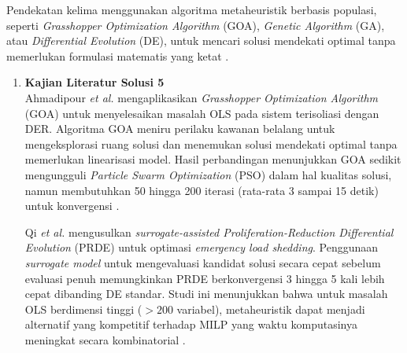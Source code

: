 Pendekatan kelima menggunakan algoritma metaheuristik berbasis populasi, seperti \textit{Grasshopper Optimization Algorithm} (GOA), \textit{Genetic Algorithm} (GA), atau \textit{Differential Evolution} (DE), untuk mencari solusi mendekati optimal tanpa memerlukan formulasi matematis yang ketat \cite{Ahmadipour2023, Qi2025}.

\begin{enumerate}
\item[a.] \textbf{Kajian Literatur Solusi 5} \\
Ahmadipour \textit{et al.} \cite{Ahmadipour2023} mengaplikasikan \textit{Grasshopper Optimization Algorithm} (GOA) untuk menyelesaikan masalah OLS pada sistem terisoliasi dengan DER. Algoritma GOA meniru perilaku kawanan belalang untuk mengeksplorasi ruang solusi dan menemukan solusi mendekati optimal tanpa memerlukan linearisasi model. Hasil perbandingan menunjukkan GOA sedikit mengungguli \textit{Particle Swarm Optimization} (PSO) dalam hal kualitas solusi, namun membutuhkan 50 hingga 200 iterasi (rata-rata 3 sampai 15 detik) untuk konvergensi \cite{Ahmadipour2023}.

Qi \textit{et al.} \cite{Qi2025} mengusulkan \textit{surrogate-assisted Proliferation-Reduction Differential Evolution} (PRDE) untuk optimasi \textit{emergency load shedding}. Penggunaan \textit{surrogate model} untuk mengevaluasi kandidat solusi secara cepat sebelum evaluasi penuh memungkinkan PRDE berkonvergensi 3 hingga 5 kali lebih cepat dibanding DE standar. Studi ini menunjukkan bahwa untuk masalah OLS berdimensi tinggi ($>200$ variabel), metaheuristik dapat menjadi alternatif yang kompetitif terhadap MILP yang waktu komputasinya meningkat secara kombinatorial \cite{Qi2025}.


\end{enumerate}
